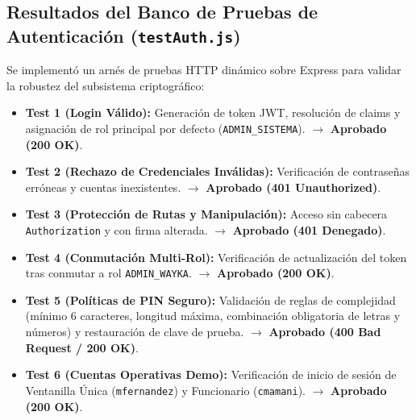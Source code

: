 \documentclass[a4paper,12pt]{article}
\begin{document}
\subsection{Resultados del Banco de Pruebas de Autenticación (\texttt{testAuth.js})}
Se implementó un arnés de pruebas HTTP dinámico sobre Express para validar la robustez del subsistema criptográfico:
\begin{itemize}[leftmargin=1.5em]
    \item \textbf{Test 1 (Login Válido):} Generación de token JWT, resolución de claims y asignación de rol principal por defecto (\texttt{ADMIN\_SISTEMA}). $\rightarrow$ \textbf{\color{colorExito}Aprobado (200 OK)}.
    \item \textbf{Test 2 (Rechazo de Credenciales Inválidas):} Verificación de contraseñas erróneas y cuentas inexistentes. $\rightarrow$ \textbf{\color{colorExito}Aprobado (401 Unauthorized)}.
    \item {\raggedright\textbf{Test 3 (Protección de Rutas y Manipulación):} Acceso sin cabecera \texttt{Authorization} y con firma alterada. $\rightarrow$ \textbf{\color{colorExito}Aprobado (401 Denegado)}.\par}
    \item \textbf{Test 4 (Conmutación Multi-Rol):} Verificación de actualización del token tras conmutar a rol \texttt{ADMIN\_WAYKA}. $\rightarrow$ \textbf{\color{colorExito}Aprobado (200 OK)}.
    \item \textbf{Test 5 (Políticas de PIN Seguro):} Validación de reglas de complejidad (mínimo 6 caracteres, longitud máxima, combinación obligatoria de letras y números) y restauración de clave de prueba. $\rightarrow$ \textbf{\color{colorExito}Aprobado (400 Bad Request / 200 OK)}.
    \item \textbf{Test 6 (Cuentas Operativas Demo):} Verificación de inicio de sesión de Ventanilla Única (\texttt{mfernandez}) y Funcionario (\texttt{cmamani}). $\rightarrow$ \textbf{\color{colorExito}Aprobado (200 OK)}.
\end{itemize}
\end{document}
